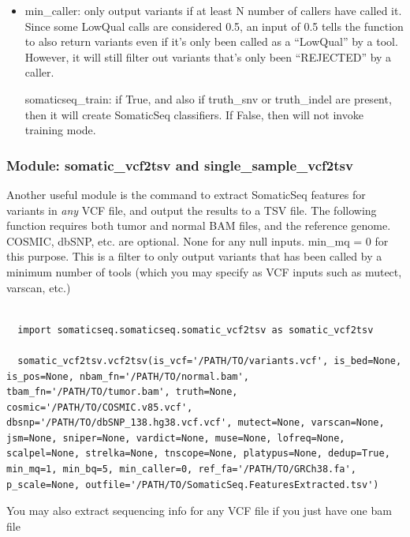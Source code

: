 \documentclass[10pt,letterpaper]{article}
\begin{document}
\begin{sloppypar}
\begin{itemize}
\item min\_caller: only output variants if at least N number of callers have called it. Since some LowQual calls are considered 0.5, an input of 0.5 tells the function to also return variants even if it's only been called as a ``LowQual'' by a tool. However, it will still filter out variants that's only been ``REJECTED'' by a caller.

somaticseq\_train: if True, and also if truth\_snv or truth\_indel are present, then it will create SomaticSeq classifiers. If False, then will not invoke training mode. 

\end{itemize}





\subsubsection{Module: somatic\_vcf2tsv and single\_sample\_vcf2tsv} \label{vcf2tsv}

Another useful module is the command to extract SomaticSeq features for variants in \emph{any} VCF file, and output the results to a TSV file. The following function requires both tumor and normal BAM files, and the reference genome. COSMIC, dbSNP, etc. are optional. None for any null inputs. min\_mq = 0 for this purpose. This is a filter to only output variants that has been called by a minimum number of tools (which you may specify as VCF inputs such as mutect, varscan, etc.)

\begin{lstlisting}

  import somaticseq.somaticseq.somatic_vcf2tsv as somatic_vcf2tsv
  
  somatic_vcf2tsv.vcf2tsv(is_vcf='/PATH/TO/variants.vcf', is_bed=None, is_pos=None, nbam_fn='/PATH/TO/normal.bam', tbam_fn='/PATH/TO/tumor.bam', truth=None, cosmic='/PATH/TO/COSMIC.v85.vcf', dbsnp='/PATH/TO/dbSNP_138.hg38.vcf.vcf', mutect=None, varscan=None, jsm=None, sniper=None, vardict=None, muse=None, lofreq=None, scalpel=None, strelka=None, tnscope=None, platypus=None, dedup=True, min_mq=1, min_bq=5, min_caller=0, ref_fa='/PATH/TO/GRCh38.fa', p_scale=None, outfile='/PATH/TO/SomaticSeq.FeaturesExtracted.tsv')

\end{lstlisting}

You may also extract sequencing info for any VCF file if you just have one bam file


\end{sloppypar}
\end{document}
